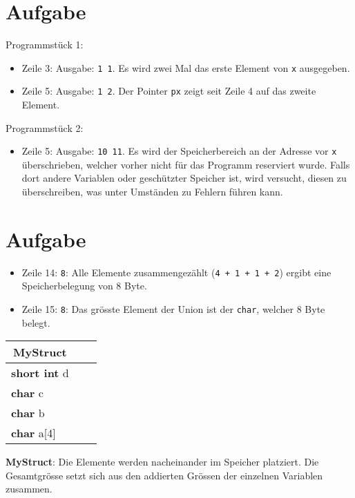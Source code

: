 \documentclass[a4paper,10pt,headlines=3.2]{scrartcl}
\begin{document}
\section{Aufgabe}
Programmstück 1:
\begin{itemize}
 \item Zeile 3: Ausgabe: \texttt{1 1}. Es wird zwei Mal das erste Element von \texttt{x} ausgegeben.
 \item Zeile 5: Ausgabe: \texttt{1 2}. Der Pointer \texttt{px} zeigt seit Zeile 4 auf das zweite Element.
\end{itemize}
\noindent Programmstück 2:
\begin{itemize}
 \item Zeile 5: Ausgabe: \texttt{10 11}. Es wird der Speicherbereich an der Adresse vor \texttt{x} überschrieben, welcher vorher nicht für das Programm reserviert wurde. Falls dort andere Variablen oder geschützter Speicher ist, wird versucht, diesen zu überschreiben, was unter Umständen zu Fehlern führen kann.
\end{itemize}

\section{Aufgabe}
\begin{itemize}
 \item Zeile 14: \texttt{8}: Alle Elemente zusammengezählt (\texttt{4 + 1 + 1 + 2}) ergibt eine Speicherbelegung von 8 Byte.
 \item Zeile 15: \texttt{8}: Das grösste Element der Union ist der \texttt{char}, welcher 8 Byte belegt.
\end{itemize}

\begin{center}
\begin{tabular}{|l|l|l|}
\hline
\multicolumn{1}{|c|}{MyStruct} \\
\hline
\multirow{2}{*}{\textbf{short int} d}   \\
 \\ \hline
\textbf{char} c \\ \hline
\textbf{char} b \\ \hline
\multirow{4}{*}{\textbf{char} a[4]}
  \\ 
  \\ 
  \\ 
  \\ \hline
\end{tabular}
\end{center}
\textbf{MyStruct}: Die Elemente werden nacheinander im Speicher platziert. Die Gesamtgrösse setzt sich aus den addierten Grössen der einzelnen Variablen zusammen.
\end{document}
